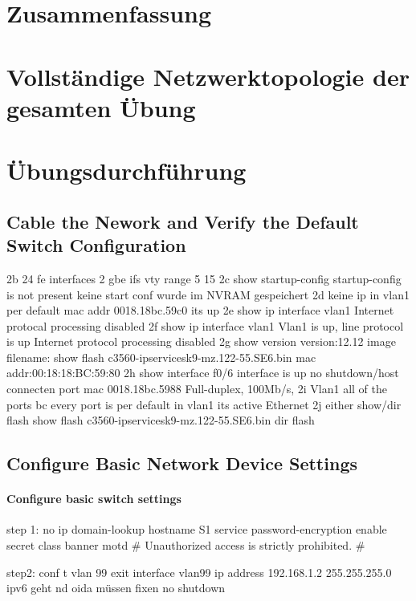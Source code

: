 \documentclass[a4paper]{article}
\begin{document}
\section{Zusammenfassung}

\newpage

\section{Vollständige Netzwerktopologie der gesamten Übung}

\newpage

\section{Übungsdurchführung}
\subsection{Cable the Nework and Verify the Default Switch Configuration}
2b
	24 fe interfaces
		2 gbe ifs
		vty range
			5 15
2c 
	show startup-config
	startup-config is not present
	keine start conf wurde im NVRAM gespeichert
2d 
	keine ip in vlan1 per default
	mac addr
	0018.18bc.59c0
	its up
2e	
	show ip interface vlan1
	Internet protocal processing disabled
2f
	show ip interface vlan1
	Vlan1 is up, line protocol is up
	Internet protocol processing disabled
2g
	show version
	version:12.12
	image filename:
	show flash
	c3560-ipservicesk9-mz.122-55.SE6.bin
	mac addr:00:18:18:BC:59:80
2h
	show interface f0/6
	interface is up
	no shutdown/host connecten
	port mac 0018.18bc.5988
	Full-duplex, 100Mb/s,
2i
	Vlan1
	all of the ports bc every port is per default in vlan1
	its active
	Ethernet
2j 
	either show/dir flash
	show flash
		c3560-ipservicesk9-mz.122-55.SE6.bin
	dir flash

\subsection{Configure Basic Network Device Settings}
\paragraph {Configure basic switch settings}

step 1:
no ip domain-lookup
hostname S1
service password-encryption
enable secret class
banner motd #
Unauthorized access is strictly prohibited. #

step2:
conf t
vlan 99 
exit
interface vlan99
ip address 192.168.1.2 255.255.255.0
ipv6 geht nd oida müssen fixen
no shutdown
\end{document}
